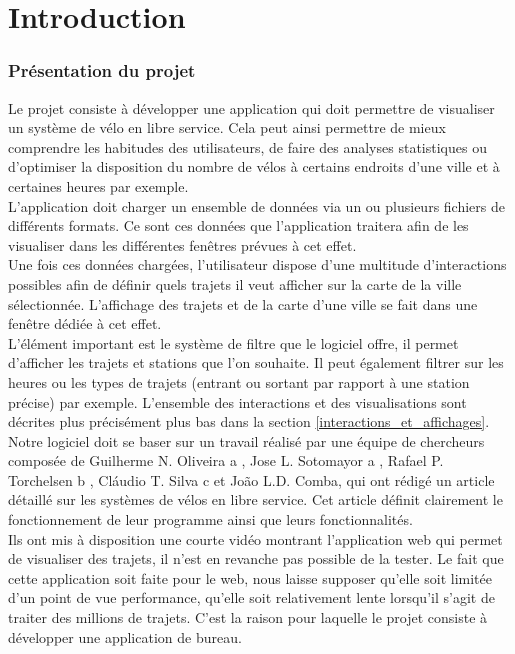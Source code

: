 \documentclass[12pt]{article}
\begin{document}
\newpage
\part{Introduction}
	
	\section{Présentation du projet} \label{introduction}
	Le projet consiste à développer une application qui doit permettre de visualiser
	un système de vélo en libre service. Cela peut ainsi permettre de mieux comprendre les habitudes
	des utilisateurs, de faire des analyses statistiques ou d'optimiser la disposition du nombre de
	vélos à certains endroits d'une ville et à certaines heures par exemple.\\

	L’application doit charger un ensemble de données via un ou plusieurs fichiers de différents formats. Ce sont ces données que l'application traitera afin de les visualiser dans les différentes fenêtres prévues à cet effet.\\
	
	Une fois ces données chargées, l'utilisateur dispose d'une multitude d'interactions
	possibles afin de définir quels trajets il veut afficher sur la carte de la ville sélectionnée.
	L'affichage des trajets et de la carte d'une ville se fait dans une fenêtre dédiée à cet effet.\\		
	L'élément important est le système de filtre que le logiciel offre, il permet d'afficher
	les trajets et stations que l’on souhaite. Il peut également filtrer sur les heures ou
	les types de trajets (entrant ou sortant par rapport à une station précise) par exemple. L'ensemble des interactions et des visualisations sont décrites plus précisément plus bas
	dans la section	\ref{interactions_et_affichages}. \\

	Notre logiciel doit se baser sur un travail réalisé par une équipe de chercheurs composée
	de Guilherme N. Oliveira a , Jose L. Sotomayor a , Rafael P. Torchelsen b , Cláudio T. Silva c
	et 
	João L.D. Comba, qui ont rédigé un article \cite{Oli16} détaillé sur les systèmes de vélos en
	libre service. Cet article définit clairement le fonctionnement de leur programme ainsi que leurs
	fonctionnalités. \\
	
	Ils ont mis à disposition une courte vidéo montrant l'application web qui permet 
	de visualiser des trajets, il n'est en revanche pas possible de la tester. Le fait
	que cette application
	soit faite pour le web, nous laisse	supposer qu’elle soit limitée d'un
	point de vue performance, qu’elle soit relativement lente lorsqu’il s’agit
	de traiter des millions de trajets. C’est la raison pour laquelle 
	le projet consiste à développer une application de bureau.
	
\end{document}
